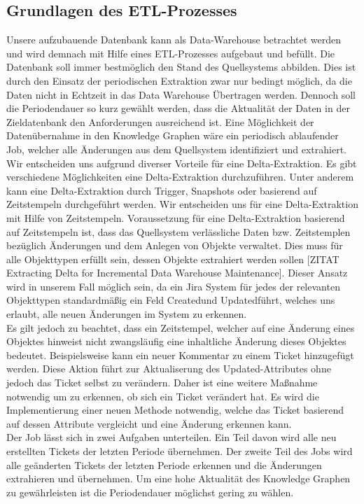 \subsection{Grundlagen des ETL-Prozesses}
Unsere aufzubauende Datenbank kann als Data-Warehouse betrachtet werden und wird demnach mit Hilfe eines ETL-Prozesses aufgebaut und befüllt. Die Datenbank soll immer bestmöglich den Stand des Quellsystems abbilden. Dies ist durch den Einsatz der periodischen Extraktion zwar nur bedingt möglich, da die Daten nicht in Echtzeit in das Data Warehouse Übertragen werden. Dennoch soll die Periodendauer so kurz gewählt werden, dass die Aktualität der Daten in der Zieldatenbank den Anforderungen ausreichend ist. Eine Möglichkeit der Datenübernahme in den Knowledge Graphen wäre ein periodisch ablaufender Job, welcher alle Änderungen aus dem Quellsystem identifiziert und extrahiert. Wir entscheiden uns aufgrund diverser Vorteile für eine Delta-Extraktion. Es gibt verschiedene Möglichkeiten eine Delta-Extraktion durchzuführen. Unter anderem kann eine Delta-Extraktion durch Trigger, Snapshots oder basierend auf Zeitstempeln durchgeführt werden. Wir entscheiden uns für eine Delta-Extraktion mit Hilfe von Zeitstempeln. Voraussetzung für eine Delta-Extraktion basierend auf Zeitstempeln ist, dass das Quellsystem verlässliche Daten bzw. Zeitstemplen bezüglich Änderungen und dem Anlegen von Objekte verwaltet. Dies muss für alle Objekttypen erfüllt sein, dessen Objekte extrahiert werden sollen [ZITAT Extracting Delta for Incremental Data Warehouse Maintenance]. Dieser Ansatz wird in unserem Fall möglich sein, da ein Jira System für jedes der relevanten Objekttypen standardmäßig ein Feld \glqq Created\grqq\:und \glqq Updated\grqq\:führt, welches uns erlaubt, alle neuen Änderungen im System zu erkennen. \\
Es gilt jedoch zu beachtet, dass ein Zeitstempel, welcher auf eine Änderung eines Objektes hinweist nicht zwangsläufig eine inhaltliche Änderung dieses Objektes bedeutet. Beispielsweise kann ein neuer Kommentar zu einem Ticket hinzugefügt werden. Diese Aktion führt zur Aktualiserung des \glqq Updated\grqq\:-Attributes ohne jedoch das Ticket selbst zu verändern. Daher ist eine weitere Maßnahme notwendig um zu erkennen, ob sich ein Ticket verändert hat. Es wird die Implementierung einer neuen Methode notwendig, welche das Ticket basierend auf dessen Attribute vergleicht und eine Änderung erkennen kann.\\
Der Job lässt sich in zwei Aufgaben unterteilen. Ein Teil davon wird alle neu erstellten Tickets der letzten Periode übernehmen. Der zweite Teil des Jobs wird alle geänderten Tickets der letzten Periode erkennen und die Änderungen extrahieren und übernehmen. Um eine hohe Aktualität des Knowledge Graphen zu gewährleisten ist die Periodendauer möglichst gering zu wählen. \\
